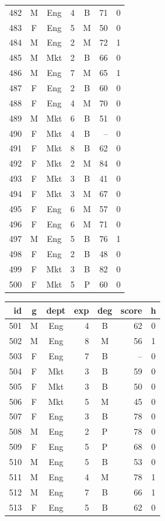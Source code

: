 \documentclass[11pt,a4paper]{article}
\begin{document}
\begin{center}
\begin{tabular}[t]{@{}r c c r c r c@{}}
482 & M & Eng & 4 & B & 71 & 0 \\
483 & F & Eng & 5 & M & 50 & 0 \\
484 & M & Eng & 2 & M & 72 & 1 \\
485 & M & Mkt & 2 & B & 66 & 0 \\
486 & M & Eng & 7 & M & 65 & 1 \\
487 & F & Eng & 2 & B & 60 & 0 \\
488 & F & Eng & 4 & M & 70 & 0 \\
489 & M & Mkt & 6 & B & 51 & 0 \\
490 & F & Mkt & 4 & B & -- & 0 \\
491 & F & Mkt & 8 & B & 62 & 0 \\
492 & F & Mkt & 2 & M & 84 & 0 \\
493 & F & Mkt & 3 & B & 41 & 0 \\
494 & F & Mkt & 3 & M & 67 & 0 \\
495 & F & Eng & 6 & M & 57 & 0 \\
496 & F & Eng & 6 & M & 71 & 0 \\
497 & M & Eng & 5 & B & 76 & 1 \\
498 & F & Eng & 2 & B & 48 & 0 \\
499 & F & Mkt & 3 & B & 82 & 0 \\
500 & F & Mkt & 5 & P & 60 & 0 \\
\bottomrule
\end{tabular}
\hfill
\begin{tabular}[t]{@{}r c c r c r c@{}}
\toprule
id & g & dept & exp & deg & score & h \\
\midrule
501 & M & Eng & 4 & B & 62 & 0 \\
502 & M & Eng & 8 & M & 56 & 1 \\
503 & F & Eng & 7 & B & -- & 0 \\
504 & F & Mkt & 3 & B & 59 & 0 \\
505 & F & Mkt & 3 & B & 50 & 0 \\
506 & F & Mkt & 5 & M & 45 & 0 \\
507 & F & Eng & 3 & B & 78 & 0 \\
508 & M & Eng & 2 & P & 78 & 0 \\
509 & F & Eng & 5 & P & 68 & 0 \\
510 & M & Eng & 5 & B & 53 & 0 \\
511 & M & Eng & 4 & M & 78 & 1 \\
512 & M & Eng & 7 & B & 66 & 1 \\
513 & F & Eng & 5 & B & 62 & 0 \\

\end{tabular}
\end{center}
\end{document}
